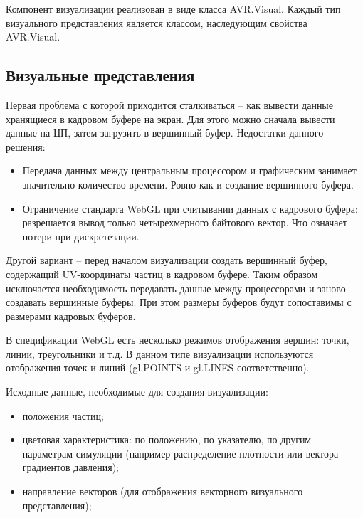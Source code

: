 Компонент визуализации реализован в виде класса AVR.Visual. Каждый тип визуального представления
является классом, наследующим свойства AVR.Visual.

\subsection{Визуальные представления}


Первая проблема с которой приходится сталкиваться -- как вывести данные хранящиеся в кадровом
буфере на экран. Для этого можно сначала вывести данные на ЦП, затем загрузить в вершинный буфер.
Недостатки данного решения:

\begin{itemize}
  \item Передача данных между центральным процессором и графическим занимает значительно
    количество времени. Ровно как и создание вершинного буфера.
  \item Ограничение стандарта WebGL при считывании данных с кадрового буфера: разрешается
    вывод только четырехмерного байтового вектор. Что означает потери при дискретезации.
\end{itemize}

Другой вариант -- перед началом визуализации создать вершинный буфер, содержащий UV-координаты
частиц в кадровом буфере. Таким образом исключается необходимость передавать данные
между процессорами и заново создавать вершинные буферы. При этом размеры буферов будут
сопоставимы с размерами кадровых буферов.

В спецификации WebGL есть несколько режимов отображения вершин: точки, линии, треугольники и т.д.
В данном типе визуализации используются отображения точек и линий (gl.POINTS и gl.LINES соответственно).

Исходные данные, необходимые для создания визуализации:

\begin{itemize}
  \item положения частиц;
  \item цветовая характеристика: по положению, по указателю, по другим параметрам симуляции 
    (например распределение плотности или вектора градиентов давления);
  \item направление векторов (для отображения векторного визуального представления);
\end{itemize}


